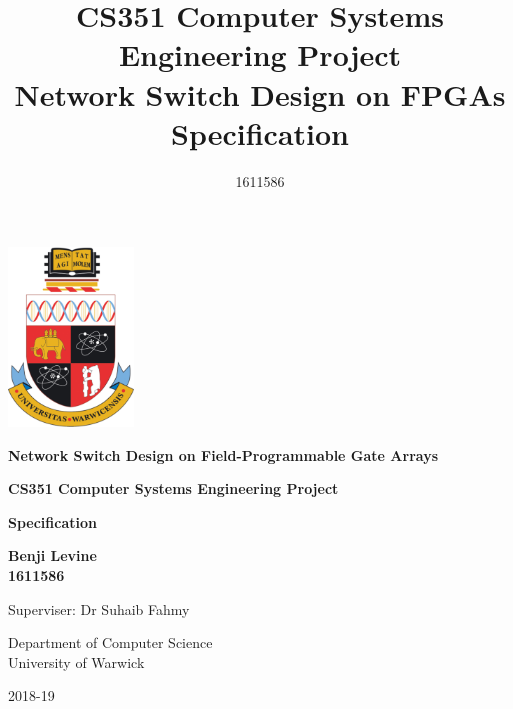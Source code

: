 \begin{titlepage}
   \begin{center}

      \includegraphics[width=0.25\textwidth]{warwick_logo_old.png}

      \vspace{1.5cm}
      \textbf{\Large{Network Switch Design on Field-Programmable Gate Arrays}}

      \vspace{1cm}
      \textbf{\large{CS351 Computer Systems Engineering Project}} \\
      \vspace{0.5cm}


      \textbf{\large{Specification}}

      \vspace{2.7cm}

      \textbf{Benji Levine} \\
      \vspace{0.1cm}
      \textbf{1611586}

      \vspace{2.7cm}

      Superviser: Dr Suhaib Fahmy

      \vspace{0.8cm}

      Department of Computer Science\\
      University of Warwick

      \vspace{0.7cm}

      2018-19

   \end{center}
\end{titlepage}


\title{CS351 Computer Systems Engineering Project \\ \vspace{0.5cm} Network Switch Design on FPGAs \\ \vspace{0.3cm} \Large{Specification}}
\author{1611586}
